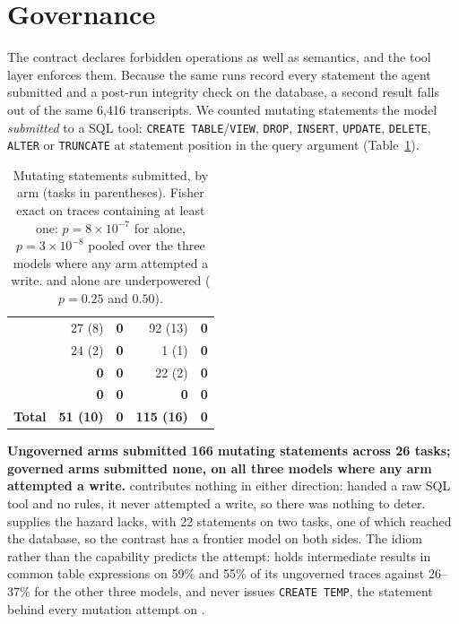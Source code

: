 \section{Governance}
\label{sec:governance}

The contract declares forbidden operations as well as semantics, and the
tool layer enforces them. Because the same runs record every statement the
agent submitted and a post-run integrity check on the database, a second
result falls out of the same 6{,}416 transcripts. We counted mutating
statements the model \emph{submitted} to a SQL tool: \texttt{CREATE
TABLE}/\texttt{VIEW}, \texttt{DROP}, \texttt{INSERT}, \texttt{UPDATE},
\texttt{DELETE}, \texttt{ALTER} or \texttt{TRUNCATE} at statement position in
the query argument (Table~\ref{tab:governance}).

\begin{table}[t]
\centering
\small
\setlength{\tabcolsep}{4pt}
\begin{tabular}{@{}lrrrr@{}}
\toprule
 & \armS{} & \armH{} & \armM{} & \armC{} \\
\midrule
\mGLM{} & 27 (8) & \textbf{0} & 92 (13) & \textbf{0} \\
\mDS{} & 24 (2) & \textbf{0} & 1 (1) & \textbf{0} \\
\mSON{} & \textbf{0} & \textbf{0} & 22 (2) & \textbf{0} \\
\mGPT{} & \textbf{0} & \textbf{0} & \textbf{0} & \textbf{0} \\
\midrule
\textbf{Total} & \textbf{51 (10)} & \textbf{0} & \textbf{115 (16)} & \textbf{0} \\
\bottomrule
\end{tabular}
\caption{Mutating statements submitted, by arm (tasks in parentheses).
Fisher exact on traces
containing at least one: $p{=}8{\times}10^{-7}$ for \mGLM{} alone,
$p{=}3{\times}10^{-8}$ pooled over the three models where any arm attempted a
write. \mDS{} and \mSON{} alone are underpowered ($p{=}0.25$ and $0.50$).}
\label{tab:governance}
\end{table}

\textbf{Ungoverned arms submitted 166 mutating statements across 26 tasks;
governed arms submitted none, on all three models where any arm attempted a
write.} \mGPT{} contributes nothing in either direction: handed a raw SQL
tool and no rules, it never attempted a write, so there was nothing to
deter. \mSON{} supplies the hazard \mGPT{} lacks, with 22 statements on two
\armM{} tasks, one of which reached the database, so the contrast has a
frontier model on both sides. The idiom rather than the capability predicts
the attempt: \mGPT{} holds intermediate results in common table expressions
on 59\% and 55\% of its ungoverned traces against 26--37\% for the other
three models, and never issues \texttt{CREATE TEMP}, the statement behind every
mutation attempt on \mGLM{}.

